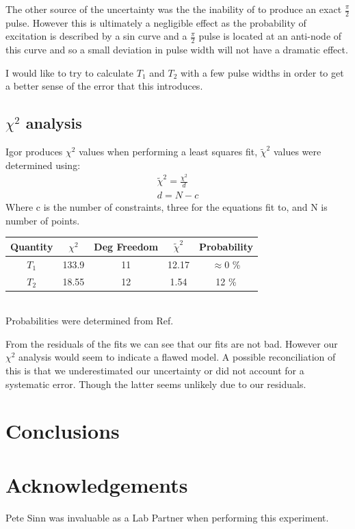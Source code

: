 \documentclass[11pt,letterpaper]{article}
\begin{document}
The other source of the uncertainty was the the inability of to produce an exact $\frac{\pi}{2}$ pulse. However this is ultimately a negligible effect as the probability of excitation is described by a sin curve and a $\frac{\pi}{2}$ pulse is located at an anti-node of this curve and so a small deviation in pulse width will not have a dramatic effect.

I would like to try to calculate $T_1$ and $T_2$ with a few pulse widths in order to get a better sense of the error that this introduces.
\subsection{$\chi^2$ analysis}
\label{sec:ChiSq}
Igor produces $\chi^2$ values when performing a least squares fit, $\tilde{\chi}^2$ values were determined using:
\begin{align}
\tilde{\chi}^2=\frac{\chi^2}{d}
\\
d=N-c
\end{align}
Where c is the number of constraints, three for the equations fit to, and N is number of points.
\begin{table}[!h]
	\begin{center}
		\begin{tabular}{|c|c|c|c|c|} \hline 
			Quantity & $\chi^2$&Deg Freedom&$\tilde{\chi}^2$  &  Probability \\ \hline \hline
			$T_1$ & 133.9 & 11 & 12.17 &  $\approx0$ \%   \\ \hline 
			$T_2$ & 18.55 & 12 & 1.54 & 12 \%   \\ \hline
		\end{tabular} \\
		Probabilities were determined from Ref. \cite{TaylorError}
	\end{center}
\end{table}

From the residuals of the fits we can see that our fits are not bad. However our $\chi^2$ analysis would seem to indicate a flawed model. A possible reconciliation of this is that we underestimated our uncertainty or did not account for a systematic error. Though the latter seems unlikely due to our residuals.

\section{Conclusions}
\section{Acknowledgements}
Pete Sinn was invaluable as a Lab Partner when performing this experiment.
\end{document}
